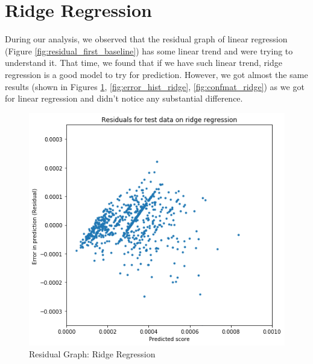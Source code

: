 \documentclass[a4paper, 11pt]{article}
\begin{document}
\section{Ridge Regression}

During our analysis, we observed that the residual graph of linear regression (Figure \ref{fig:residual_first_baseline}) has some linear trend and were trying to understand it. That time, we found that if we have such linear trend, ridge regression is a good model to try for prediction. However, we got almost the same results (shown in Figures \ref{fig:residual_ridge_regression}, \ref{fig:error_hist_ridge}, \ref{fig:confmat_ridge}) as we got for linear regression and didn't notice any substantial difference.

\begin{figure}[!htb] 
  \includegraphics[width=\linewidth]{residual_ridge_regression.png}
    \caption{Residual Graph: Ridge Regression}
  \label{fig:residual_ridge_regression}
\endminipage\hfill
{}

\end{figure}
\end{document}
